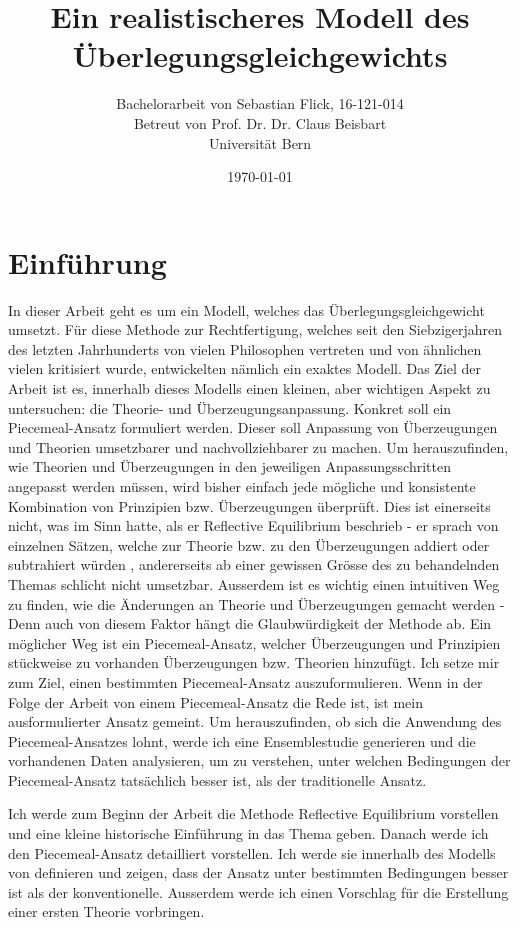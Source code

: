 \documentclass{article}
\title{Ein realistischeres Modell des Überlegungsgleichgewichts}
\author{Bachelorarbeit von Sebastian Flick, 16-121-014\\Betreut von Prof. Dr. Dr. Claus Beisbart\\Universität Bern}
\date{\today}
\begin{document}
\maketitle
\section{Einführung}
In dieser Arbeit geht es um ein Modell, welches das Überlegungsgleichgewicht umsetzt. Für diese Methode zur Rechtfertigung, welches seit den Siebzigerjahren des letzten Jahrhunderts von vielen Philosophen vertreten und von ähnlichen vielen kritisiert wurde, entwickelten \citeauthor{beisbart_making_2021} nämlich ein exaktes Modell.
Das Ziel der Arbeit ist es, innerhalb dieses Modells einen kleinen, aber wichtigen Aspekt zu untersuchen: die Theorie- und Überzeugungsanpassung. Konkret soll ein Piecemeal-Ansatz formuliert werden. Dieser soll Anpassung von Überzeugungen und Theorien umsetzbarer und nachvollziehbarer zu machen. Um herauszufinden, wie Theorien und Überzeugungen in den jeweiligen Anpassungsschritten angepasst werden müssen, wird bisher einfach jede mögliche und konsistente Kombination von Prinzipien bzw. Überzeugungen überprüft. Dies ist einerseits nicht, was \citeauthor{goodman_fact_1983} im Sinn hatte, als er Reflective Equilibrium beschrieb - er sprach von einzelnen Sätzen, welche zur Theorie bzw. zu den Überzeugungen addiert oder subtrahiert würden \autocite{goodman_fact_1983}, andererseits ab einer gewissen Grösse des zu behandelnden Themas schlicht nicht umsetzbar. Ausserdem ist es wichtig einen intuitiven Weg zu finden, wie die Änderungen an Theorie und Überzeugungen gemacht werden - Denn auch von diesem Faktor hängt die Glaubwürdigkeit der Methode ab. Ein möglicher Weg ist ein Piecemeal-Ansatz, welcher Überzeugungen und Prinzipien stückweise zu vorhanden Überzeugungen bzw. Theorien hinzufügt. Ich setze mir zum Ziel, einen bestimmten Piecemeal-Ansatz auszuformulieren. Wenn in der Folge der Arbeit von einem Piecemeal-Ansatz die Rede ist, ist mein ausformulierter Ansatz gemeint. Um herauszufinden, ob sich die Anwendung des Piecemeal-Ansatzes lohnt, werde ich eine Ensemblestudie generieren und die vorhandenen Daten analysieren, um zu verstehen, unter welchen Bedingungen der Piecemeal-Ansatz tatsächlich besser ist, als der traditionelle Ansatz.

Ich werde zum Beginn der Arbeit die Methode Reflective Equilibrium vorstellen und eine kleine historische Einführung in das Thema geben. Danach werde ich den Piecemeal-Ansatz detailliert vorstellen. Ich werde sie innerhalb des Modells von \citeauthor{beisbart_making_2021} definieren und zeigen, dass der Ansatz unter bestimmten Bedingungen besser ist als der konventionelle. Ausserdem werde ich einen Vorschlag für die Erstellung einer ersten Theorie vorbringen.
\end{document}
